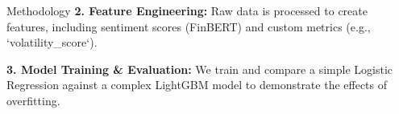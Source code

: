 \documentclass[final]{beamer}
\begin{document}
\begin{frame}[t]
\begin{columns}[T]
\begin{column}{0.4\linewidth}
\begin{block}{Methodology}
        \textbf{2. Feature Engineering:}
        Raw data is processed to create features, including sentiment scores (FinBERT) and custom metrics (e.g., `volatility\_score`).

        \textbf{3. Model Training & Evaluation:}
        We train and compare a simple Logistic Regression against a complex LightGBM model to demonstrate the effects of overfitting.

        \vspace{0.5cm}
        \begin{center}
        \end{center}
      \end{block}
    \end{column}


\end{columns}
\end{frame}
\end{document}
